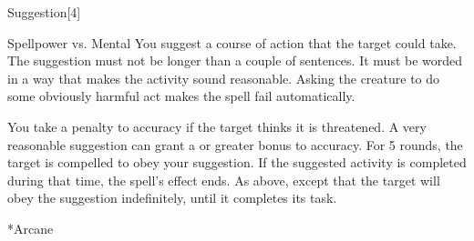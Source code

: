 \begin{spellsection}{Suggestion}[4]
    \begin{spellheader}
    \end{spellheader}
    \begin{spellcontent}
        \begin{spelltargetinginfo}
        \end{spelltargetinginfo}
        \begin{spelleffects}
            \begin{spellattack}{Spellpower vs. Mental}
                \spellspecial You suggest a course of action that the target could take. The suggestion must not be longer than a couple of sentences. It must be worded in a way that makes the activity sound reasonable. Asking the creature to do some obviously harmful act makes the spell fail automatically.

                You take a  penalty to accuracy if the target thinks it is threatened. A very reasonable suggestion can grant a  or greater bonus to accuracy.
                \spellsuccess For 5 rounds, the target is compelled to obey your suggestion. If the suggested activity is completed during that time, the spell's effect ends.
                \spellcritical As above, except that the target will obey the suggestion indefinitely, until it completes its task.
            \end{spellattack}
        \end{spelleffects}
    \end{spellcontent}
    \begin{spellfooter}
        *{Arcane}
        \norepeatspellnotes
        \miscastrandom
    \end{spellfooter}
    \begin{spellaugments}
    \end{spellaugments}
\end{spellsection}

